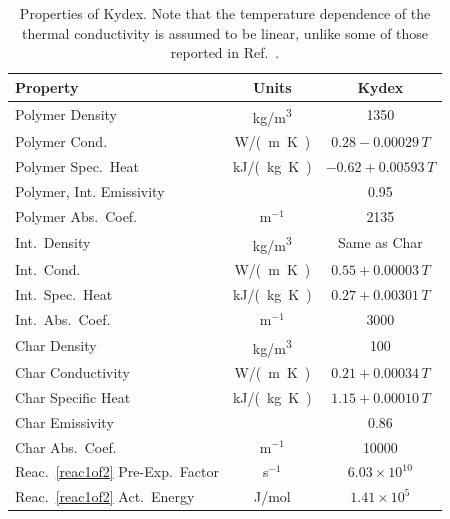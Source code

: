 \begin{table}[!h]
\caption[Properties of Kydex]{Properties of Kydex. Note that the temperature dependence of the thermal conductivity is assumed to be linear, unlike some of those reported in Ref.~\cite{Li:Thesis}.}
\centering
\begin{tabular}{|l|c|c|}
\hline
Property                                 & Units         & Kydex                    \\ \hline \hline
Polymer Density                          & \unit{kg/m^3}      & 1350                     \\ \hline
Polymer Cond.                            & \unit{W/(m.K)}& $0.28-0.00029 \, T$      \\ \hline
Polymer Spec.~Heat                       & \unit{kJ/(kg.K)}       & $-0.62+0.00593  \, T$    \\ \hline
Polymer, Int. Emissivity                 &               & 0.95                     \\ \hline
Polymer Abs.~Coef.                       & m$^{-1}$      & 2135                     \\ \hline
Int.~Density                             & \unit{kg/m^3}      & Same as Char             \\ \hline
Int.~Cond.                               & \unit{W/(m.K)}& $0.55+0.00003 \, T$      \\ \hline
Int.~Spec.~Heat                          & \unit{kJ/(kg.K)}       & $0.27+0.00301  \, T$     \\ \hline
Int.~Abs.~Coef.                          & m$^{-1}$      & 3000                     \\ \hline
Char Density                             & \unit{kg/m^3}      & 100                      \\ \hline
Char Conductivity                        & \unit{W/(m.K)}& $0.21+0.00034 \, T$      \\ \hline
Char Specific Heat                       & \unit{kJ/(kg.K)}       & $1.15+0.00010 \, T$      \\ \hline
Char Emissivity                          &               & 0.86                     \\ \hline
Char Abs.~Coef.                          & m$^{-1}$      & 10000                    \\ \hline
Reac.~\ref{reac1of2} Pre-Exp.~Factor     & s$^{-1}$      & $6.03\times 10^{10}$     \\ \hline
Reac.~\ref{reac1of2} Act.~Energy         & J/mol       & $1.41\times 10^5$        \\ \hline

\end{tabular}
\end{table}
